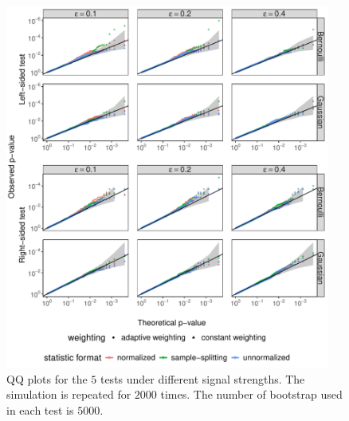 \documentclass[12pt]{article}
\begin{document}
\begin{figure}[!ht]
	\centering
	\includegraphics[width=0.95\textwidth]{figures-and-tables/simulation/thompson_qq_plot.pdf}

	\caption{QQ plots for the $5$ tests under different signal strengths. The simulation is repeated for $2000$ times. The number of bootstrap used in each test is $5000$.}
	\label{fig:simulation-qq-plot-thompson}
\end{figure}
\end{document}

